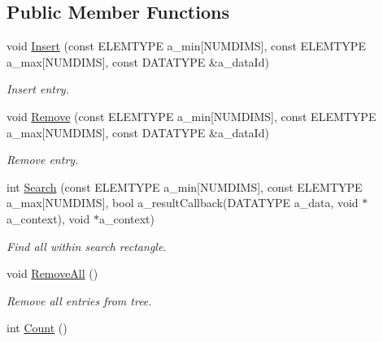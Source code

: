 \subsection*{\-Public \-Member \-Functions}
\begin{DoxyCompactItemize}
\item 
void \hyperlink{class_r_tree_a98d1f0a325921db826b2a2d5a407c9be}{\-Insert} (const \-E\-L\-E\-M\-T\-Y\-P\-E a\-\_\-min\mbox{[}\-N\-U\-M\-D\-I\-M\-S\mbox{]}, const \-E\-L\-E\-M\-T\-Y\-P\-E a\-\_\-max\mbox{[}\-N\-U\-M\-D\-I\-M\-S\mbox{]}, const \-D\-A\-T\-A\-T\-Y\-P\-E \&a\-\_\-data\-Id)
\begin{DoxyCompactList}\small\item\em \-Insert entry. \end{DoxyCompactList}\item 
void \hyperlink{class_r_tree_a1b4b6b4c73bc47029ba696c49265c043}{\-Remove} (const \-E\-L\-E\-M\-T\-Y\-P\-E a\-\_\-min\mbox{[}\-N\-U\-M\-D\-I\-M\-S\mbox{]}, const \-E\-L\-E\-M\-T\-Y\-P\-E a\-\_\-max\mbox{[}\-N\-U\-M\-D\-I\-M\-S\mbox{]}, const \-D\-A\-T\-A\-T\-Y\-P\-E \&a\-\_\-data\-Id)
\begin{DoxyCompactList}\small\item\em \-Remove entry. \end{DoxyCompactList}\item 
int \hyperlink{class_r_tree_ae9bce2b305f6e84f57f05dcab3f19156}{\-Search} (const \-E\-L\-E\-M\-T\-Y\-P\-E a\-\_\-min\mbox{[}\-N\-U\-M\-D\-I\-M\-S\mbox{]}, const \-E\-L\-E\-M\-T\-Y\-P\-E a\-\_\-max\mbox{[}\-N\-U\-M\-D\-I\-M\-S\mbox{]}, bool a\-\_\-result\-Callback(\-D\-A\-T\-A\-T\-Y\-P\-E a\-\_\-data, void $\ast$a\-\_\-context), void $\ast$a\-\_\-context)
\begin{DoxyCompactList}\small\item\em \-Find all within search rectangle. \end{DoxyCompactList}\item 
\hypertarget{class_r_tree_a396f1031eb2c8224715741fd0b77349d}{void \hyperlink{class_r_tree_a396f1031eb2c8224715741fd0b77349d}{\-Remove\-All} ()}\label{class_r_tree_a396f1031eb2c8224715741fd0b77349d}

\begin{DoxyCompactList}\small\item\em \-Remove all entries from tree. \end{DoxyCompactList}\item 
\hypertarget{class_r_tree_a813cdf63ce3e3e255821d9ba4bc9e7df}{int \hyperlink{class_r_tree_a813cdf63ce3e3e255821d9ba4bc9e7df}{\-Count} ()}\label{class_r_tree_a813cdf63ce3e3e255821d9ba4bc9e7df}


\end{DoxyCompactItemize}
